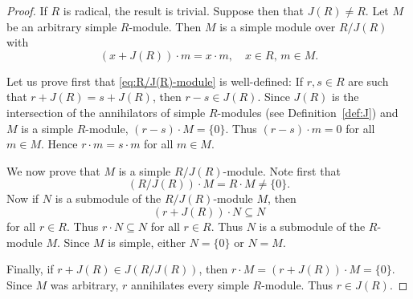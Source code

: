 \begin{proof}
	If $R$ is radical, the result is trivial. Suppose then that 
	$J(R)\ne R$. Let $M$ be an arbitrary simple $R$-module. Then $M$ is 
	a simple module over $R/J(R)$ with 
	\begin{equation}
	    \label{eq:R/J(R)-module}
     	(x+J(R))\cdot m=x\cdot m,\quad
		x\in R,\,m\in M.
	\end{equation}
 
  Let us prove first that \eqref{eq:R/J(R)-module} is well-defined: If
  $r,s\in R$ are such that $r+J(R)=s+J(R)$, then $r-s\in J(R)$. Since $J(R)$
  is the intersection of the annihilators of simple $R$-modules (see
  Definition~\ref{def:J}) and $M$ is a simple $R$-module, $(r-s)\cdot
  M=\{0\}$. Thus $(r-s)\cdot m=0$ for all $m\in M$. Hence $r\cdot m=s\cdot m$
  for all $m\in M$. 

  We now prove that $M$ is a simple $R/J(R)$-module. 
  Note first that 
  \[
    (R/J(R))\cdot M=R\cdot M\ne\{0\}.
  \]
  Now if $N$ is a submodule of the $R/J(R)$-module $M$, then 
  \[
    (r+J(R))\cdot N\subseteq N
  \]
  for all $r\in R$. Thus $r\cdot N\subseteq N$ for all $r\in R$. Thus $N$ is a submodule of the $R$-module $M$. Since $M$ is simple, either $N=\{0\}$ or $N=M$. 

  Finally, if $r+J(R)\in J(R/J(R))$, then  $r\cdot M=(r+J(R))\cdot M=\{0\}$.
  Since $M$ was arbitrary, $r$ annihilates every simple $R$-module.  Thus $r\in
  J(R)$.
\end{proof}




